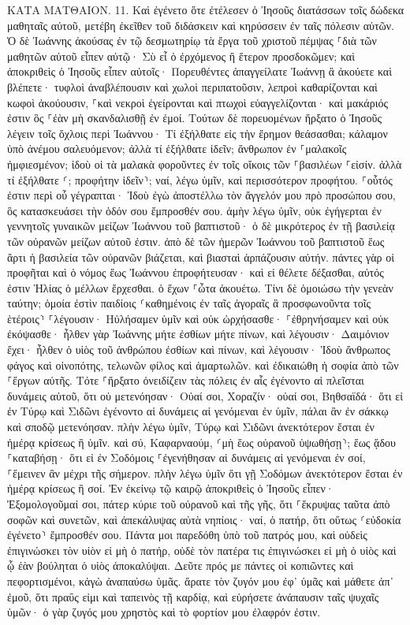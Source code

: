 \documentclass[twoside, 9pt]{extreport}
\begin{document}
ΚΑΤΑ ΜΑΤΘΑΙΟΝ.
11.
Καὶ ἐγένετο ὅτε ἐτέλεσεν ὁ Ἰησοῦς διατάσσων τοῖς δώδεκα μαθηταῖς αὐτοῦ, μετέβη ἐκεῖθεν τοῦ διδάσκειν καὶ κηρύσσειν ἐν ταῖς πόλεσιν αὐτῶν. 
Ὁ δὲ Ἰωάννης ἀκούσας ἐν τῷ δεσμωτηρίῳ τὰ ἔργα τοῦ χριστοῦ πέμψας ⸀διὰ τῶν μαθητῶν αὐτοῦ 
εἶπεν αὐτῷ· Σὺ εἶ ὁ ἐρχόμενος ἢ ἕτερον προσδοκῶμεν; 
καὶ ἀποκριθεὶς ὁ Ἰησοῦς εἶπεν αὐτοῖς· Πορευθέντες ἀπαγγείλατε Ἰωάννῃ ἃ ἀκούετε καὶ βλέπετε· 
τυφλοὶ ἀναβλέπουσιν καὶ χωλοὶ περιπατοῦσιν, λεπροὶ καθαρίζονται καὶ κωφοὶ ἀκούουσιν, ⸀καὶ νεκροὶ ἐγείρονται καὶ πτωχοὶ εὐαγγελίζονται· 
καὶ μακάριός ἐστιν ὃς ⸀ἐὰν μὴ σκανδαλισθῇ ἐν ἐμοί. 
Τούτων δὲ πορευομένων ἤρξατο ὁ Ἰησοῦς λέγειν τοῖς ὄχλοις περὶ Ἰωάννου· Τί ἐξήλθατε εἰς τὴν ἔρημον θεάσασθαι; κάλαμον ὑπὸ ἀνέμου σαλευόμενον; 
ἀλλὰ τί ἐξήλθατε ἰδεῖν; ἄνθρωπον ἐν ⸀μαλακοῖς ἠμφιεσμένον; ἰδοὺ οἱ τὰ μαλακὰ φοροῦντες ἐν τοῖς οἴκοις τῶν ⸀βασιλέων ⸀εἰσίν. 
ἀλλὰ τί ἐξήλθατε ⸂; προφήτην ἰδεῖν⸃; ναί, λέγω ὑμῖν, καὶ περισσότερον προφήτου. 
⸀οὗτός ἐστιν περὶ οὗ γέγραπται· Ἰδοὺ ἐγὼ ἀποστέλλω τὸν ἄγγελόν μου πρὸ προσώπου σου, ὃς κατασκευάσει τὴν ὁδόν σου ἔμπροσθέν σου. 
ἀμὴν λέγω ὑμῖν, οὐκ ἐγήγερται ἐν γεννητοῖς γυναικῶν μείζων Ἰωάννου τοῦ βαπτιστοῦ· ὁ δὲ μικρότερος ἐν τῇ βασιλείᾳ τῶν οὐρανῶν μείζων αὐτοῦ ἐστιν. 
ἀπὸ δὲ τῶν ἡμερῶν Ἰωάννου τοῦ βαπτιστοῦ ἕως ἄρτι ἡ βασιλεία τῶν οὐρανῶν βιάζεται, καὶ βιασταὶ ἁρπάζουσιν αὐτήν. 
πάντες γὰρ οἱ προφῆται καὶ ὁ νόμος ἕως Ἰωάννου ἐπροφήτευσαν· 
καὶ εἰ θέλετε δέξασθαι, αὐτός ἐστιν Ἠλίας ὁ μέλλων ἔρχεσθαι. 
ὁ ἔχων ⸀ὦτα ἀκουέτω. 
Τίνι δὲ ὁμοιώσω τὴν γενεὰν ταύτην; ὁμοία ἐστὶν παιδίοις ⸂καθημένοις ἐν ταῖς ἀγοραῖς ἃ προσφωνοῦντα τοῖς ἑτέροις⸃ 
⸀λέγουσιν· Ηὐλήσαμεν ὑμῖν καὶ οὐκ ὠρχήσασθε· ⸀ἐθρηνήσαμεν καὶ οὐκ ἐκόψασθε· 
ἦλθεν γὰρ Ἰωάννης μήτε ἐσθίων μήτε πίνων, καὶ λέγουσιν· Δαιμόνιον ἔχει· 
ἦλθεν ὁ υἱὸς τοῦ ἀνθρώπου ἐσθίων καὶ πίνων, καὶ λέγουσιν· Ἰδοὺ ἄνθρωπος φάγος καὶ οἰνοπότης, τελωνῶν φίλος καὶ ἁμαρτωλῶν. καὶ ἐδικαιώθη ἡ σοφία ἀπὸ τῶν ⸀ἔργων αὐτῆς. 
Τότε ⸀ἤρξατο ὀνειδίζειν τὰς πόλεις ἐν αἷς ἐγένοντο αἱ πλεῖσται δυνάμεις αὐτοῦ, ὅτι οὐ μετενόησαν· 
Οὐαί σοι, Χοραζίν· οὐαί σοι, Βηθσαϊδά· ὅτι εἰ ἐν Τύρῳ καὶ Σιδῶνι ἐγένοντο αἱ δυνάμεις αἱ γενόμεναι ἐν ὑμῖν, πάλαι ἂν ἐν σάκκῳ καὶ σποδῷ μετενόησαν. 
πλὴν λέγω ὑμῖν, Τύρῳ καὶ Σιδῶνι ἀνεκτότερον ἔσται ἐν ἡμέρᾳ κρίσεως ἢ ὑμῖν. 
καὶ σύ, Καφαρναούμ, ⸂μὴ ἕως οὐρανοῦ ὑψωθήσῃ⸃; ἕως ᾅδου ⸀καταβήσῃ· ὅτι εἰ ἐν Σοδόμοις ⸀ἐγενήθησαν αἱ δυνάμεις αἱ γενόμεναι ἐν σοί, ⸀ἔμεινεν ἂν μέχρι τῆς σήμερον. 
πλὴν λέγω ὑμῖν ὅτι γῇ Σοδόμων ἀνεκτότερον ἔσται ἐν ἡμέρᾳ κρίσεως ἢ σοί. 
Ἐν ἐκείνῳ τῷ καιρῷ ἀποκριθεὶς ὁ Ἰησοῦς εἶπεν· Ἐξομολογοῦμαί σοι, πάτερ κύριε τοῦ οὐρανοῦ καὶ τῆς γῆς, ὅτι ⸀ἔκρυψας ταῦτα ἀπὸ σοφῶν καὶ συνετῶν, καὶ ἀπεκάλυψας αὐτὰ νηπίοις· 
ναί, ὁ πατήρ, ὅτι οὕτως ⸂εὐδοκία ἐγένετο⸃ ἔμπροσθέν σου. 
Πάντα μοι παρεδόθη ὑπὸ τοῦ πατρός μου, καὶ οὐδεὶς ἐπιγινώσκει τὸν υἱὸν εἰ μὴ ὁ πατήρ, οὐδὲ τὸν πατέρα τις ἐπιγινώσκει εἰ μὴ ὁ υἱὸς καὶ ᾧ ἐὰν βούληται ὁ υἱὸς ἀποκαλύψαι. 
Δεῦτε πρός με πάντες οἱ κοπιῶντες καὶ πεφορτισμένοι, κἀγὼ ἀναπαύσω ὑμᾶς. 
ἄρατε τὸν ζυγόν μου ἐφ᾽ ὑμᾶς καὶ μάθετε ἀπ᾽ ἐμοῦ, ὅτι πραΰς εἰμι καὶ ταπεινὸς τῇ καρδίᾳ, καὶ εὑρήσετε ἀνάπαυσιν ταῖς ψυχαῖς ὑμῶν· 
ὁ γὰρ ζυγός μου χρηστὸς καὶ τὸ φορτίον μου ἐλαφρόν ἐστιν. 
\end{document}
